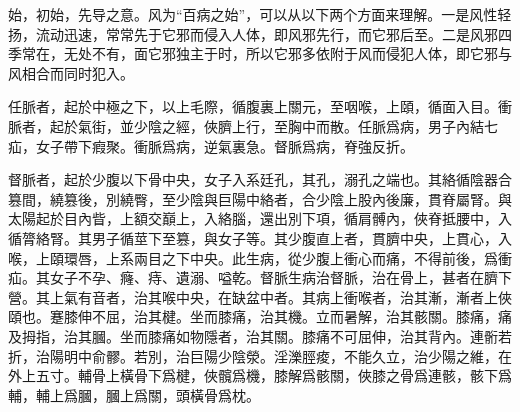 \documentclass[12pt]{ctexbook}%
\begin{document}


始，初始，先导之意。风为“百病之始”，可以从以下两个方面来理解。一是风性轻扬，流动迅速，常常先于它邪而侵入人体，即风邪先行，而它邪后至。二是风邪四季常在，无处不有，面它邪独主于时，所以它邪多依附于风而侵犯人体，即它邪与风相合而同时犯入。


\begin{yuanwen}
任脈者，起於中極之下，以上毛際，循腹裏上關元，至咽喉，上頤，循面入目。衝脈者，起於氣街，並少陰之經，俠臍上行，至胸中而散。任脈爲病，男子內結七疝，女子帶下瘕聚。衝脈爲病，逆氣裏急。督脈爲病，脊強反折。

督脈者，起於少腹以下骨中央，女子入系廷孔，其孔，溺孔之端也。其絡循陰器合篡間，繞篡後，別繞臀，至少陰與巨陽中絡者，合少陰上股內後廉，貫脊屬腎。與太陽起於目內眥，上額交巔上，入絡腦，還出別下項，循肩髆內，俠脊抵腰中，入循膂絡腎。其男子循莖下至篡，與女子等。其少腹直上者，貫臍中央，上貫心，入喉，上頤環唇，上系兩目之下中央。此生病，從少腹上衝心而痛，不得前後，爲衝疝。其女子不孕、癃、痔、遺溺、嗌乾。督脈生病治督脈，治在骨上，甚者在臍下營。其上氣有音者，治其喉中央，在缺盆中者。其病上衝喉者，治其漸，漸者上俠頤也。蹇膝伸不屈，治其楗。坐而膝痛，治其機。立而暑解，治其骸關。膝痛，痛及拇指，治其膕。坐而膝痛如物隱者，治其關。膝痛不可屈伸，治其背內。連䯒若折，治陽明中俞髎。若別，治巨陽少陰滎。淫濼脛痠，不能久立，治少陽之維，在外上五寸。輔骨上橫骨下爲楗，俠髖爲機，膝解爲骸關，俠膝之骨爲連骸，骸下爲輔，輔上爲膕，膕上爲關，頭橫骨爲枕。
\end{yuanwen}

\end{document}
